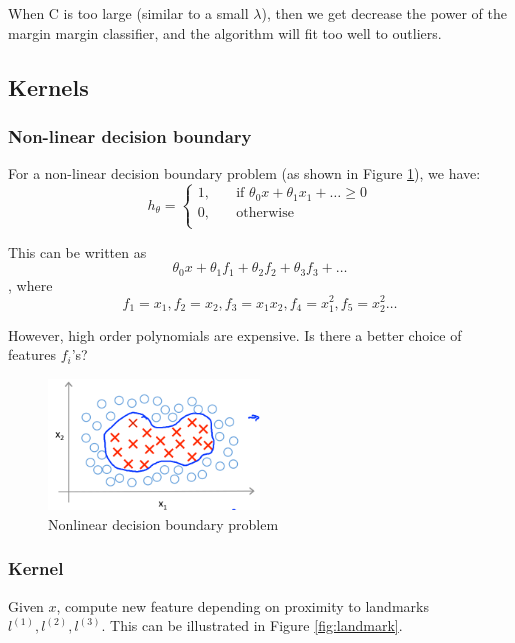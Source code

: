         When C is too large (similar to a small $\lambda$), then we get decrease the power of the margin margin classifier, and the algorithm will fit too well to outliers. 

\subsection{Kernels}
    \subsubsection{Non-linear decision boundary}
    For a non-linear decision boundary problem (as shown in Figure \ref{fig:non-linear-decision-boundary-problem}), we have:
        \[
            h_{\theta} = 
            \begin{cases}
                1,                      &\quad \text{if } \theta_0 x + \theta_1 x_1 + \dots \geq 0 \\
                0,                      &\quad \text{otherwise } \\
            \end{cases}
        \] 

        This can be written as 
        \[
        \theta_0 x + \theta_1 f_1 + \theta_2 f_2+ \theta_3 f_3 + \dots
        \] 
        , where 
        \[
            f_1 = x_1, f_2 = x_2, f_3 = x_1x_2, f_4 = x_1^2, f_5 = x_2^2 \dots
        \] 


        However, high order polynomials are expensive. Is there a better choice of features $f_i$'s?

        \begin{figure}[htpb]
            \centering
            \includegraphics[width=0.5\textwidth]{image/non-linear-decision-boundary.png}
            \caption{Nonlinear decision boundary problem}
            \label{fig:non-linear-decision-boundary-problem}
        \end{figure}

    \subsubsection{Kernel}
    Given $x$, compute new feature depending on proximity to landmarks $l^{(1)}, l^{(2)}, l^{(3)}$. This can be illustrated in Figure \ref{fig:landmark}. 

